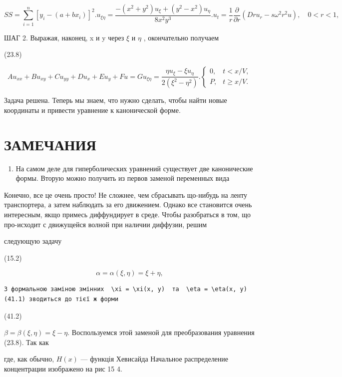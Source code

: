 \documentclass[
  ukrainian,
]{article}
\providecommand{\tightlist}{%
  \setlength{\itemsep}{0pt}\setlength{\parskip}{0pt}}
\begin{document}
\[
SS = \sum_{i=1}^{n} [y_i - (a + bx_i)]^2.
u_{\xi\eta} = \frac{-(x^2 + y^2) u_{\xi} + (y^2 - x^2) u_{\eta}}{8x^2y^3}.
u_t = \frac{1}{r} \frac{\partial}{\partial r} \left( Dr u_r - s \omega^2 r^2 u \right), \quad 0 < r < 1,
\]

ШАГ 2. Выражая, наконец, x и y через \(\xi\) и \(\eta\) , окончательно
получаем

(23.8)

\[
Au_{xx} + Bu_{xy} + Cu_{yy} + Du_x + Eu_y + Fu = G
u_{\xi\eta} = \frac{\eta u_{\xi} - \xi u_{\eta}}{2(\xi^2 - \eta^2)}.
\begin{cases} 0, & t < x/V, \\ P, & t \ge x/V. \end{cases}
\]

Задача решена. Теперь мы знаем, что нужно сделать, чтобы найти новые
координаты и привести уравнение к канонической форме.

\section{ЗАМЕЧАНИЯ}\label{ux437ux430ux43cux435ux447ux430ux43dux438ux44f-3}

\begin{enumerate}
\def\labelenumi{\arabic{enumi}.}
\tightlist
\item
  На самом деле для гиперболических уравнений существует две
  канонические формы. Вторую можно получить из первов заменой переменных
  вида
\end{enumerate}

Конечно, все це очень просто! Не сложнее, чем сбрасывать що-нибудь на
ленту транспортера, а затем наблюдать за его движением. Однако все
становится очень интересным, якщо примесь диффундирует в среде. Чтобы
разобраться в том, що про-исходит с движущейся волной при наличии
диффузии, решим

следующую задачу

(15.2)

\[
\alpha = \alpha (\xi, \eta) = \xi + \eta,
\]

\begin{verbatim}
З формальною заміною змінних  \xi = \xi(x, y)  та  \eta = \eta(x, y)  (41.1) зводиться до тієї ж форми
\end{verbatim}

(41.2)

\(\beta = \beta (\xi, \eta) = \xi - \eta.\) Воспользуемся этой заменой
для преобразования уравнения (23.8). Так как

где, как обычно, \(H(x)\) --- функція Хевисайда Начальное распределение
концентрации изображено на рис 15 4.
\end{document}
